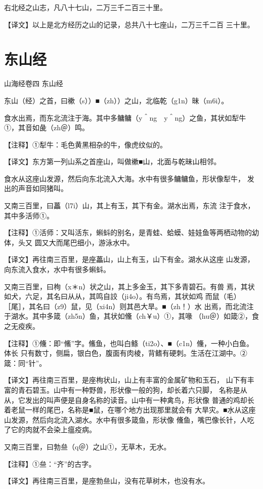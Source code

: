 \documentclass[a4paper,12pt,UTF8,twoside]{ctexbook}
\begin{document}
右北经之山志，凡八十七山，二万三千二百三十里。

【译文】以上是北方经历之山的记录，总共八十七座山，二万三千二百 三十里。


\chapter{东山经}

山海经卷四 东山经


东山（经）之首，曰樕（s））■（zh））之山，北临乾（g1n）昧（m6i）。

食水出焉，而东北流注于海。其中多鳙鳙（y＾ng　y＾ng）之鱼，其状如犁牛 ①，其音如彘（zh＠）鸣。

【注释】①犁牛：毛色黄黑相杂的牛，像虎纹似的。

【译文】东方第一列山系之首座山，叫做樕■山，北面与乾昧山相邻。

食水从这座山发源，然后向东北流入大海。水中有很多鳙鳙鱼，形状像犁牛， 发出的声音如同猪叫。

又南三百里，曰藟（l7i）山，其上有玉，其下有金。湖水出焉，东流 注于食水，其中多活师①。

【注释】①活师：又叫活东，蝌蚪的别名，是青蛙、蛤蟆、娃娃鱼等两栖动物的幼体，头又 圆又大而尾巴细小，游泳水中。

【译文】再往南三百里，是座藟山，山上有玉，山下有金。湖水从这座 山发源，向东流入食水，水中有很多蝌蚪。

又南三百里，曰栒（x＊n）状之山，其上多金玉，其下多青碧石。有兽 焉，其状如犬，六足，其名曰从从，其鸣自詨（ji4o）。有鸟焉，其状如鸡 而鼠（毛）［尾］，其名曰（z9）鼠，见（xi4n）则其邑大旱。■（zh！）水 出焉，而北流注于湖水。其中多箴（zh5n）鱼，其状如儵（ch￥u）①，其喙 （hu＠）如箴②，食之无疫疾。

【注释】①儵：即“鯈”字。鯈鱼，也叫白鲦（ti2o）、■（c1n）儵，一种小白鱼。体长 只有数寸，侧扁，银白色，腹面有肉棱，背鳍有硬刺。生活在江湖中。②箴：同“针”。

【译文】再往南三百里，是座栒状山，山上有丰富的金属矿物和玉石， 山下有丰富的青石碧玉。山中有一种野兽，形状像一般的狗，却长着六只脚， 名称是从从，它发出的叫声便是自身名称的读音。山中有一种禽鸟，形状像 普通的鸡却长着老鼠一样的尾巴，名称是■鼠，在哪个地方出现那里就会有 大旱灾。■水从这座山发源，然后向北流入湖水。水中有很多箴鱼，形状像 儵鱼，嘴巴像长针，人吃了它的肉就不会染上瘟疫病。

又南三百里，曰勃亝（q＠）之山①，无草木，无水。

【注释】①亝：“齐”的古字。

【译文】再往南三百里，是座勃亝山，没有花草树木，也没有水。
\end{document}
